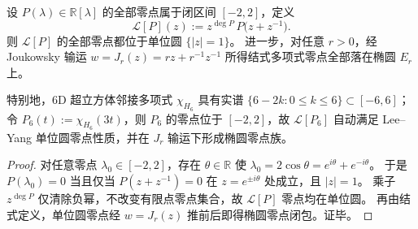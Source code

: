 \begin{theorem}\label{thm:xi-interval-spectrum-leyang-lift-6d-hypercube}
设 \(P(\lambda)\in\mathbb R[\lambda]\) 的全部零点属于闭区间 \([-2,2]\)，定义
\[
\mathcal L[P](z):=z^{\deg P}\,P\!\bigl(z+z^{-1}\bigr).
\]
则 \(\mathcal L[P]\) 的全部零点都位于单位圆 \(\{|z|=1\}\)。
进一步，对任意 \(r>0\)，经 Joukowsky 输运
\(
w=J_r(z)=rz+r^{-1}z^{-1}
\)
所得结式多项式零点全部落在椭圆 \(E_r\) 上。

特别地，6D 超立方体邻接多项式 \(\chi_{H_6}\) 具有实谱 \(\{6-2k:0\le k\le 6\}\subset[-6,6]\)；
令 \(P_6(t):=\chi_{H_6}(3t)\)，则 \(P_6\) 的零点位于 \([-2,2]\)，故
\(
\mathcal L[P_6]
\)
自动满足 Lee--Yang 单位圆零点性质，并在 \(J_r\) 输运下形成椭圆零点族。
\end{theorem}
\begin{proof}
对任意零点 \(\lambda_0\in[-2,2]\)，存在 \(\theta\in\mathbb R\) 使
\(
\lambda_0=2\cos\theta=e^{i\theta}+e^{-i\theta}
\)。
于是 \(P(\lambda_0)=0\) 当且仅当
\(
P(z+z^{-1})=0
\)
在 \(z=e^{\pm i\theta}\) 处成立，且 \(|z|=1\)。
乘子 \(z^{\deg P}\) 仅清除负幂，不改变有限点零点集合，故 \(\mathcal L[P]\) 零点均在单位圆。
再由结式定义，单位圆零点经 \(w=J_r(z)\) 推前后即得椭圆零点闭包。证毕。
\end{proof}

